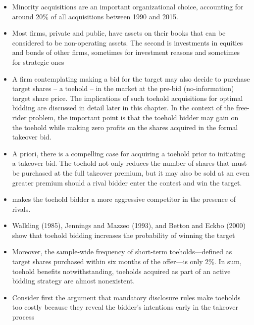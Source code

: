 \documentclass[12pt]{article}
\begin{document}
    \begin{itemize}

        \item Minority acquisitions are an important organizational choice, accounting for around 20\% of all acquisitions between 1990 and 2015.\citep{huang}

        \item Most firms, private and public, have assets on their books that can be considered to be non-operating assets. The second is investments in equities and bonds of other firms, sometimes for investment reasons and sometimes for strategic ones \citep{Damodaran2005}

        \item A firm contemplating making a bid for the target may also decide to purchase target shares -- a toehold -- in the market at the pre-bid (no-information) target share price. The implications of such toehold acquisitions for optimal bidding are discussed in detail later in this chapter. In the context of the free-rider problem, the important point is that the toehold bidder may gain on the toehold while making zero profits on the shares acquired in the formal takeover bid. \citep{Mitchell2011}

        \item A priori, there is a compelling case for acquiring a toehold prior to initiating a takeover bid. The toehold not only reduces the number of shares that must be purchased at the full takeover premium, but it may also be sold at an even greater premium should a rival bidder enter the contest and win the target. \citep{Mitchell2011}

        \item makes the toehold bidder a more aggressive competitor in the presence of rivals. \citep{Mitchell2011}

        \item Walkling (1985), Jennings and Mazzeo (1993), and Betton and Eckbo (2000) show that toehold bidding increases the probability of winning the target \citep{Mitchell2011}

        \item Moreover, the sample-wide frequency of short-term toeholds—defined as target shares purchased within six months of the offer—is only 2\%. In sum, toehold benefits notwithstanding, toeholds acquired as part of an active bidding strategy are almost nonexistent. \citep{Mitchell2011}

        \item Consider first the argument that mandatory disclosure rules make toeholds too costly because they reveal the bidder’s intentions early in the takeover process \citep{Mitchell2011}


\end{itemize}
\end{document}
